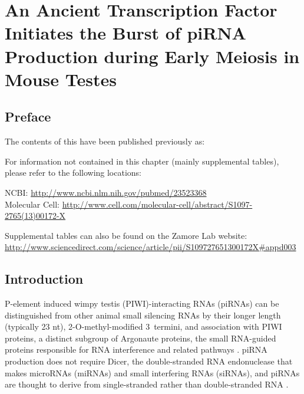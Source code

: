 \chapter{An Ancient Transcription Factor Initiates the Burst of piRNA Production during Early Meiosis in Mouse Testes} 
\label{MolCel} 
\section{Preface}
  \label{MolCel:sec:Preface}

  The contents of this have been published previously as:

  \begin{quote}
    \itshape 
    \singlespacing
    \end{quote}

  For information not contained in this chapter (mainly supplemental tables), please refer to the following locations: 

  NCBI: \url{http://www.ncbi.nlm.nih.gov/pubmed/23523368} \\
  Molecular Cell: \url{http://www.cell.com/molecular-cell/abstract/S1097-2765(13)00172-X}

  Supplemental tables can also be found on the Zamore Lab website: \url{http://www.sciencedirect.com/science/article/pii/S109727651300172X#appd003}

\section{Introduction}
  \label{MolCel:sec:Introduction}

  P-element induced wimpy testis (PIWI)-interacting RNAs (piRNAs) can be distinguished from other animal small silencing RNAs by their longer length (typically 23 nt), 2\textprime-O-methyl-modified 3\textprime~termini, and association with PIWI proteins, a distinct subgroup of Argonaute proteins, the small RNA-guided proteins responsible for RNA interference and related pathways \citep{Kumar1998,Farazi2008,Kim2009,Thomson2009,Cenik2011,Aravin2008}. piRNA production does not require Dicer, the double-stranded RNA endonuclease that makes microRNAs (miRNAs) and small interfering RNAs (siRNAs), and piRNAs are thought to derive from single-stranded rather than double-stranded RNA \citep{Vagin2006, Houwing2007}.

